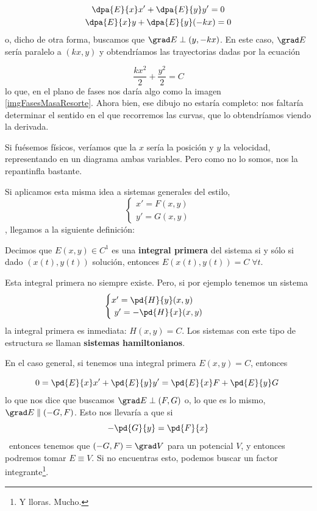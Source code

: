 \documentclass[nochap]{apuntes}
\begin{document}
\begin{gather*}
\dpa{E}{x}  x' + \dpa{E}{y}y' = 0 \\
\dpa{E}{x} y + \dpa{E}{y} (-kx) = 0
\end{gather*}
o, dicho de otra forma, buscamos que $\grad E \perp (y,-kx)$. En este caso, $\grad E$ sería paralelo a $(kx,y)$ y obtendríamos las trayectorias dadas por la ecuación

\[ \frac{kx^2}{2} + \frac{y^2}{2} = C 
\]
lo que, en el plano de fases nos daría algo como la imagen \ref{imgFasesMasaResorte}. Ahora bien, ese dibujo no estaría completo: nos faltaría determinar el sentido en el que recorremos las curvas, que lo obtendríamos viendo la derivada.


Si fuésemos físicos, veríamos que la $x$ sería la posición y $y$ la velocidad, representando en un diagrama ambas variables. Pero como no lo somos, nos la repantinfla bastante.


Si aplicamos esta misma idea a sistemas generales del estilo, \[ \begin{cases} x' = F(x,y) \\ y' = G(x,y) \end{cases} \], llegamos a la siguiente definición:

\begin{defn} Decimos que $E(x,y) ∈ C^1$ es una \textbf{integral primera} del sistema si y sólo si dado $(x(t),y(t))$ solución, entonces $E(x(t),y(t)) = C\;∀t$.
\end{defn} 

Esta integral primera no siempre existe. Pero, si por ejemplo tenemos un sistema \[ \begin{cases} x' = \pd{H}{y}(x,y) \\ y' = -\pd{H}{x}(x,y) \end{cases} \] la integral primera es inmediata: $H(x,y) = C$. Los sistemas con este tipo de estructura se llaman \textbf{sistemas hamiltonianos}.

En el caso general, si tenemos una integral primera $E(x,y) = C$, entonces

\[ 0 = \pd{E}{x}x' + \pd{E}{y} y' = \pd{E}{x}F + \pd{E}{y} G 
\] 
lo que nos dice que buscamos $\grad E \perp (F,G)$ o, lo que es lo mismo, $\grad E \parallel (-G,F)$. Esto nos llevaría a que si \[ -\pd{G}{y} = \pd{F}{x}\] entonces tenemos que $(-G,F) = \grad V$ para un potencial $V$, y entonces podremos tomar $E\equiv V$. Si no encuentras esto, podemos buscar un factor integrante\footnote{Y lloras. Mucho.}.
\end{document}

